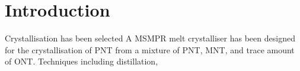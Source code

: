 \section{Introduction}\label{separation conclusions}

Crystallisation has been selected A MSMPR melt crystalliser has been designed for the crystallisation of PNT from a mixture of PNT, MNT, and trace amount of ONT. Techniques including distillation, 